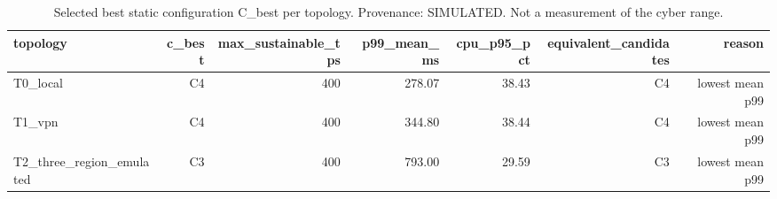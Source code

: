 \begin{table}[t]
\caption{Selected best static configuration C\_best per topology. Provenance: SIMULATED.  Not a measurement of the cyber range.}
\label{tab:table_best_static}
\centering
\begin{tabular}{lrrrrrr}
\hline
topology & c\_best & max\_sustainable\_tps & p99\_mean\_ms & cpu\_p95\_pct & equivalent\_candidates & reason \\
\hline
T0\_local & C4 & 400 & 278.07 & 38.43 & C4 & lowest mean p99 \\
T1\_vpn & C4 & 400 & 344.80 & 38.44 & C4 & lowest mean p99 \\
T2\_three\_region\_emulated & C3 & 400 & 793.00 & 29.59 & C3 & lowest mean p99 \\
\hline
\end{tabular}
\end{table}

